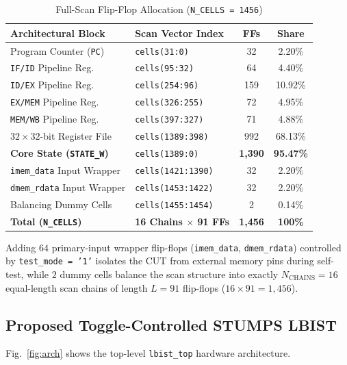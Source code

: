 \documentclass[conference]{IEEEtran}
\begin{document}
\begin{table}[H]
    \centering
    \caption{Full-Scan Flip-Flop Allocation (\texttt{N\_CELLS = 1456})}
    \label{tab:scan_map}
    \begin{tabular}{@{}llcc@{}}
        \toprule
        \textbf{Architectural Block} & \textbf{Scan Vector Index} & \textbf{FFs} & \textbf{Share} \\
        \midrule
        Program Counter (\texttt{PC}) & \texttt{cells(31:0)} & 32 & 2.20\% \\
        \texttt{IF/ID} Pipeline Reg. & \texttt{cells(95:32)} & 64 & 4.40\% \\
        \texttt{ID/EX} Pipeline Reg. & \texttt{cells(254:96)} & 159 & 10.92\% \\
        \texttt{EX/MEM} Pipeline Reg. & \texttt{cells(326:255)} & 72 & 4.95\% \\
        \texttt{MEM/WB} Pipeline Reg. & \texttt{cells(397:327)} & 71 & 4.88\% \\
        $32 \times 32$-bit Register File & \texttt{cells(1389:398)} & 992 & 68.13\% \\
        \midrule
        \textbf{Core State (\texttt{STATE\_W})} & \texttt{cells(1389:0)} & \textbf{1,390} & \textbf{95.47\%} \\
        \midrule
        \texttt{imem\_data} Input Wrapper & \texttt{cells(1421:1390)} & 32 & 2.20\% \\
        \texttt{dmem\_rdata} Input Wrapper & \texttt{cells(1453:1422)} & 32 & 2.20\% \\
        Balancing Dummy Cells & \texttt{cells(1455:1454)} & 2 & 0.14\% \\
        \midrule
        \textbf{Total (\texttt{N\_CELLS})} & \textbf{16 Chains $\times$ 91 FFs} & \textbf{1,456} & \textbf{100\%} \\
        \bottomrule
    \end{tabular}
\end{table}

Adding $64$ primary-input wrapper flip-flops (\texttt{imem\_data}, \texttt{dmem\_rdata}) controlled by \texttt{test\_mode = '1'} isolates the CUT from external memory pins during self-test, while $2$ dummy cells balance the scan structure into exactly $N_{\text{CHAINS}} = 16$ equal-length scan chains of length $L = 91$ flip-flops ($16 \times 91 = 1,456$).

\subsection{Proposed Toggle-Controlled STUMPS LBIST}
Fig.~\ref{fig:arch} shows the top-level \texttt{lbist\_top} hardware architecture.
\end{document}
